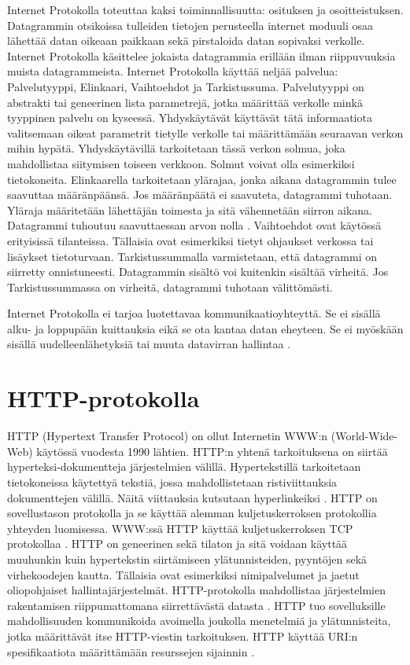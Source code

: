 \documentclass[utf8]{gradu3}
\begin{document}
Internet Protokolla toteuttaa kaksi toiminnallisuutta: osituksen ja osoitteistuksen. Datagrammin otsikoissa tulleiden tietojen perusteella internet moduuli osaa lähettää datan oikeaan paikkaan sekä pirstaloida datan sopivaksi verkolle. Internet Protokolla käsittelee jokaista datagrammia erillään ilman riippuvuuksia muista datagrammeista. Internet Protokolla käyttää neljää palvelua: Palvelutyyppi, Elinkaari, Vaihtoehdot ja Tarkistussuma. Palvelutyyppi on abstrakti tai geneerinen lista parametrejä, jotka määrittää verkolle minkä tyyppinen palvelu on kyseessä. Yhdyskäytävät käyttävät tätä informaatiota valitsemaan oikeat parametrit tietylle verkolle tai määrittämään seuraavan verkon mihin hypätä. Yhdyskäytävillä tarkoitetaan tässä verkon solmua, joka mahdollistaa siitymisen toiseen verkkoon. Solmut voivat olla esimerkiksi tietokoneita. Elinkaarella tarkoitetaan ylärajaa, jonka aikana datagrammin tulee saavuttaa määränpäänsä. Jos määränpäätä ei saavuteta, datagrammi tuhotaan. Yläraja määritetään lähettäjän toimesta ja sitä vähennetään siirron aikana. Datagrammi tuhoutuu saavuttaessan arvon nolla \cite{internet_protocol}. Vaihtoehdot ovat käytössä erityisissä tilanteissa. Tällaisia ovat esimerkiksi tietyt ohjaukset verkossa tai lisäykset tietoturvaan. Tarkistussummalla varmistetaan, että datagrammi on siirretty onnistuneesti. Datagrammin sisältö voi kuitenkin sisältää virheitä. Jos Tarkistussummassa on virheitä, datagrammi tuhotaan välittömästi. 

Internet Protokolla ei tarjoa luotettavaa kommunikaatioyhteyttä. Se ei sisällä alku- ja loppupään kuittauksia eikä se ota kantaa datan eheyteen. Se ei myöskään sisällä uudelleenlähetyksiä tai muuta datavirran hallintaa \cite{internet_procotol}.
\section{HTTP-protokolla}
HTTP (Hypertext Transfer Protocol) on ollut Internetin WWW:n (World-Wide-Web) käytössä vuodesta 1990 lähtien. HTTP:n yhtenä tarkoituksena on siirtää hyperteksi-dokumentteja järjestelmien välillä. Hypertekstillä tarkoitetaan tietokoneissa käytettyä tekstiä, jossa mahdollistetaan ristiviittauksia dokumenttejen välillä. Näitä viittauksia kutsutaan hyperlinkeiksi \cite{hypertext}. HTTP on sovellustason protokolla ja se käyttää alemman kuljetuskerroksen protokollia yhteyden luomisessa. WWW:ssä HTTP käyttää kuljetuskerroksen TCP protokollaa \cite{w3http}. HTTP on geneerinen sekä tilaton ja sitä voidaan käyttää muuhunkin kuin hypertekstin siirtämiseen ylätunnisteiden, pyyntöjen sekä virhekoodejen kautta. Tällaisia ovat esimerkiksi nimipalvelumet ja jaetut oliopohjaiset hallintajärjestelmät. HTTP-protokolla mahdollistaa järjestelmien rakentamisen riippumattomana siirrettävästä datasta \cite{http}. HTTP tuo sovelluksille mahdollisuuden kommunikoida avoimella joukolla menetelmiä ja ylätunnisteita, jotka määrittävät itse HTTP-viestin tarkoituksen. HTTP käyttää URI:n spesifikaatiota määrittämään resurssejen sijainnin \cite{uri}.
\end{document}
